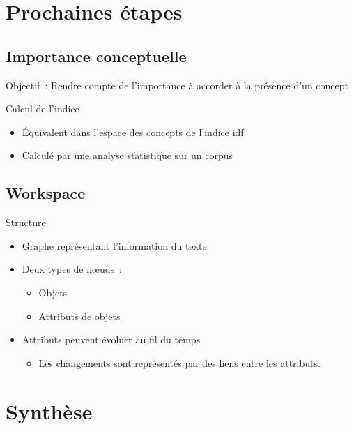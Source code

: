 \documentclass{beamer}
\begin{document}
\section{Prochaines étapes}
\subsection{Importance conceptuelle}
\begin{frame}
  \begin{block}{Objectif~:}
    Rendre compte de l'importance à accorder à la présence d'un concept
  \end{block}

  \begin{block}{Calcul de l'indice}
    \begin{itemize}
      \item Équivalent dans l'espace des concepts de l'indice idf
      \item Calculé par une analyse statistique sur un corpus
    \end{itemize}
  \end{block}
\end{frame}
\subsection{Workspace}
\begin{frame}
  \begin{block}{Structure}
  \begin{itemize}
    \item Graphe représentant l'information du texte
    \item Deux types de nœuds~:
      \begin{itemize}
        \item Objets
        \item Attributs de objets
      \end{itemize}
    \item Attributs peuvent évoluer au fil du temps
    \begin{itemize}
    	\item Les changements sont représentés par des liens entre les attributs.
    \end{itemize}
  \end{itemize}
  \end{block}
\end{frame}

\section{Synthèse}
\end{document}

